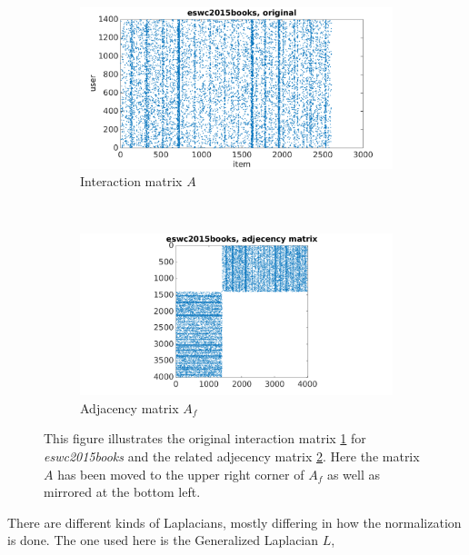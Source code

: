 \begin{figure}[h!]
    \begin{subfigure}[h!]{0.5\textwidth}
        \includegraphics[width=\textwidth]{fig/spectral_data/eswc2015books_original.png}
        \caption{Interaction matrix $A$}
        \label{fig:spec:book:orig}
    \end{subfigure}
    ~
    \begin{subfigure}[h!]{0.5\textwidth}
        \includegraphics[width=\textwidth]{fig/spectral_data/eswc2015books_adj.png}
        \caption{Adjacency matrix $A_f$}
        \label{fig:spec:book:adj}
    \end{subfigure}
    \caption{This figure illustrates the original interaction matrix \ref{fig:spec:book:orig} for \textit{eswc2015books} and the related adjecency matrix \ref{fig:spec:book:adj}. Here the matrix $A$ has been moved to the upper right corner of $A_f$ as well as mirrored at the bottom left.}
    \label{fig:spec:book:matrix}
\end{figure}

There are different kinds of Laplacians, mostly differing in how the normalization is done. The one used here is the Generalized Laplacian $L$,

